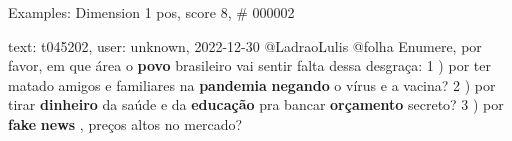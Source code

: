 \begin{frame}{Examples: Dimension 1 pos, score 8, \# 000002}
\footnotesize
\begin{exampleblock}{text: t045202, user: unknown, 2022-12-30}
@LadraoLulis @folha Enumere, por favor, em que área o \textbf{povo} brasileiro 
vai sentir falta dessa desgraça: 1 ) por ter matado amigos e familiares na 
\textbf{pandemia} \textbf{negando} o vírus e a vacina? 2 ) por tirar 
\textbf{dinheiro} da saúde e da \textbf{educação} pra bancar \textbf{orçamento} 
secreto? 3 ) por \textbf{fake} \textbf{news} , preços altos no mercado? 
\end{exampleblock}
\end{frame}
